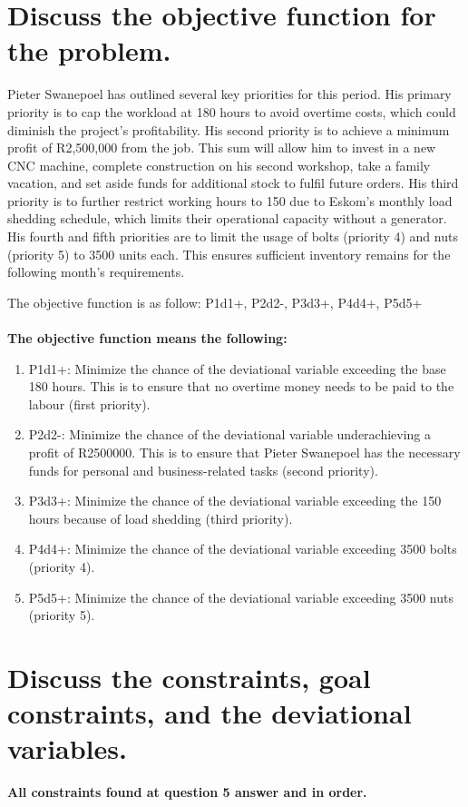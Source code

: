 \documentclass[a4paper,oneside,11pt]{book}
\begin{document}
\section{Discuss the objective function for the problem.}
Pieter Swanepoel has outlined several key priorities for this period. His primary priority is to cap the workload at 180 hours to avoid overtime costs, which could diminish the project's profitability. His second priority is to achieve a minimum profit of R2,500,000 from the job. This sum will allow him to invest in a new CNC machine, complete construction on his second workshop, take a family vacation, and set aside funds for additional stock to fulfil future orders. His third priority is to further restrict working hours to 150 due to Eskom's monthly load shedding schedule, which limits their operational capacity without a generator.  His fourth and fifth priorities are to limit the usage of bolts (priority 4) and nuts (priority 5) to 3500 units each. This ensures sufficient inventory remains for the following month's requirements.

The objective function is as follow: P1d1+, P2d2-, P3d3+, P4d4+, P5d5+ \\\\
\textbf{The objective function means the following:}
\begin{enumerate}
    \item P1d1+: Minimize the chance of the deviational variable exceeding the base 180 hours. This is to ensure that no overtime money needs to be paid to the labour (first priority). 
    \item P2d2-: Minimize the chance of the deviational variable underachieving a profit of R2500000. This is to ensure that Pieter Swanepoel has the necessary funds for personal and business-related tasks (second priority). 
    \item P3d3+: Minimize the chance of the deviational variable exceeding the 150 hours because of load shedding (third priority).
    \item P4d4+: Minimize the chance of the deviational variable exceeding 3500 bolts (priority 4).
    \item P5d5+: Minimize the chance of the deviational variable exceeding 3500 nuts (priority 5).
\end{enumerate}
\section{Discuss the constraints, goal constraints, and the deviational variables.}
\textbf{All constraints found at question 5 answer and in order.}
\end{document}
